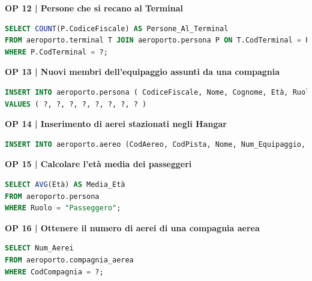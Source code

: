 \textbf{\small OP 12 | Persone che si recano al Terminal}\\

\begin{lstlisting}[language=SQL]
SELECT COUNT(P.CodiceFiscale) AS Persone_Al_Terminal
FROM aeroporto.terminal T JOIN aeroporto.persona P ON T.CodTerminal = P.CodTerminal
WHERE P.CodTerminal = ?;
\end{lstlisting}


\textbf{\small OP 13 | Nuovi membri dell'equipaggio assunti da una compagnia}\\

\begin{lstlisting}[language=SQL]
INSERT INTO aeroporto.persona ( CodiceFiscale, Nome, Cognome, Età, Ruolo, Ora_Inizio, Ora_fine, CodAereo )
VALUES ( ?, ?, ?, ?, ?, ?, ?, ? )	
\end{lstlisting}


\textbf{\small OP 14 | Inserimento di aerei stazionati negli Hangar}\\

\begin{lstlisting}[language=SQL]
INSERT INTO aeroporto.aereo (CodAereo, CodPista, Nome, Num_Equipaggio, Peso, Tipologia, CodHangar) VALUES( ?, ?, ?, ?, ?, ?);	
\end{lstlisting}


\textbf{\small OP 15 | Calcolare l'età media dei passeggeri}\\

\begin{lstlisting}[language=SQL]
SELECT AVG(Età) AS Media_Età
FROM aeroporto.persona
WHERE Ruolo = "Passeggero";	
\end{lstlisting}


\textbf{\small OP 16 | Ottenere il numero di aerei di una compagnia aerea}\\

\begin{lstlisting}[language=SQL]
SELECT Num_Aerei
FROM aeroporto.compagnia_aerea
WHERE CodCompagnia = ?;	
\end{lstlisting}


